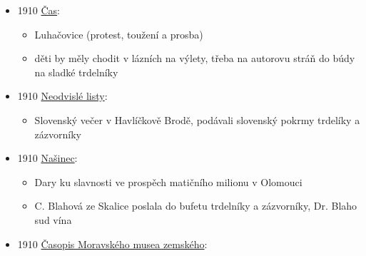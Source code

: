 \begin{itemize}
  \begin{itemize}
  \tightlist
  \item
    č. 216, 8. 8., s. 5
  \item
    Ždánice, velká národní slavnost ve prospěch Ústřední Matice školské
  \item
    paní Vaníčková věnovala mísu trdelníků
  \end{itemize}
\item
  1910
  \href{https://ceskadigitalniknihovna.cz/view/uuid:b06a8860-7d9d-11e9-85ec-005056825209?page=uuid\%3Ab3e88f80-7e35-11e9-b171-5ef3fc9ae867&fulltext=trdeln\%C3\%ADk\%20OR\%20trdeln\%C3\%ADky\%20OR\%20trdeln\%C3\%ADk\%C5\%AF&source=nkp}{Čas}:

  \begin{itemize}
  \tightlist
  \item
    Luhačovice (protest, toužení a prosba)
  \item
    děti by měly chodit v lázních na výlety, třeba na autorovu stráň do
    búdy na sladké trdelníky
  \end{itemize}
\item
  1910
  \href{https://ceskadigitalniknihovna.cz/view/uuid:9619abc6-e10c-479a-a5c6-82a48f7789f4?page=uuid\%3Adefe860e-1878-4938-89bc-3a04bc29b94b&source=kkp}{Neodvislé
  listy}:

  \begin{itemize}
  \tightlist
  \item
    Slovenský večer v Havlíčkově Brodě, podávali slovenský pokrmy
    trdelíky a zázvorníky
  \end{itemize}
\item
  1910
  \href{https://ceskadigitalniknihovna.cz/uuid/uuid:55792482-8297-11e0-b92b-0050569d679d}{Našinec}:

  \begin{itemize}
  \tightlist
  \item
    Dary ku slavnosti ve prospěch matičního milionu v Olomouci
  \item
    C. Blahová ze Skalice poslala do bufetu trdelníky a zázvorníky, Dr.
    Blaho sud vína
  \end{itemize}
\item
  1910
  \href{https://ceskadigitalniknihovna.cz/uuid/uuid:f19aaf80-126a-11e8-8cd8-5ef3fc9bb22f}{Časopis
  Moravského musea zemského}:


\end{itemize}
